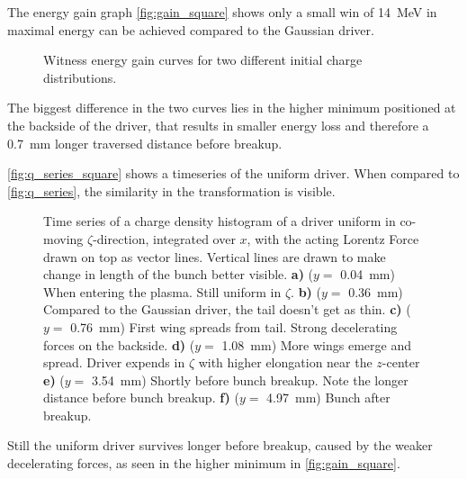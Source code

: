 \documentclass[bachelor_thesis]{subfiles}
\begin{document}
The energy gain graph \autoref{fig:gain_square} shows only a small win of \qty{14}{\MeV} in maximal energy can be achieved compared to the Gaussian driver.
\begin{figure}
	\centering
	
	\caption{Witness energy gain curves for two different initial charge distributions.}
	\label{fig:gain_square}
\end{figure}
The biggest difference in the two curves lies in the higher minimum positioned at the backside of the driver, that results in smaller energy loss and therefore a \qty{0.7}{mm} longer traversed distance before breakup.

\autoref{fig:q_series_square} shows a timeseries of the uniform driver. When compared to \autoref{fig:q_series}, the similarity in the transformation is visible.
\begin{figure}
	\centering
	
	\caption{Time series of a charge density histogram of a driver uniform in co-moving $\zeta$-direction, integrated over $x$, with the acting Lorentz Force drawn on top as vector lines. Vertical lines are drawn to make change in length of the bunch better visible. 
	\textbf{a)} ($y=$ \qty{0.04}{mm}) When entering the plasma. Still uniform in $\zeta$.
	\textbf{b)} ($y=$ \qty{0.36}{mm}) Compared to the Gaussian driver, the tail doesn't get as thin.
	\textbf{c)} ($y=$ \qty{0.76}{mm}) First wing spreads from tail. Strong decelerating forces on the backside.
	\textbf{d)} ($y=$ \qty{1.08}{mm}) More wings emerge and spread. Driver expends in $\zeta$ with higher elongation near the $z$-center
	\textbf{e)} ($y=$ \qty{3.54}{mm}) Shortly before bunch breakup. Note the longer distance before bunch breakup.
	\textbf{f)} ($y=$ \qty{4.97}{mm}) Bunch after breakup.}
	\label{fig:q_series_square}
\end{figure}
Still the uniform driver survives longer before breakup, caused by the weaker decelerating forces, as seen in the higher minimum in \autoref{fig:gain_square}.
\end{document}
